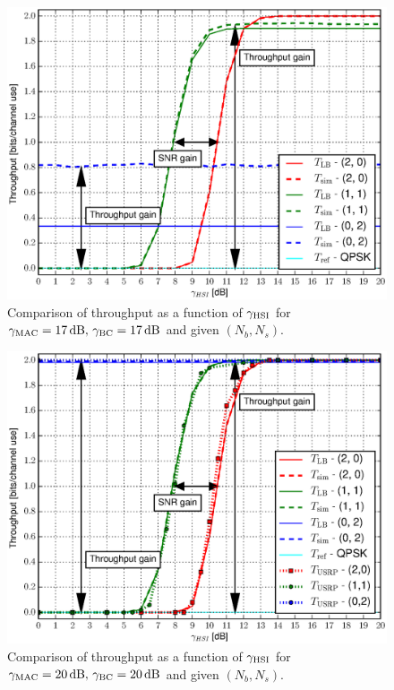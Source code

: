 \documentclass{article}
\begin{document}
\begin{figure}
\begin{centering}
\hspace*{-0.04\columnwidth}
\includegraphics[width=0.95\columnwidth]{fig/Throughput_HSI_XOR_MAC17_BC17_N2}
\par\end{centering}

\caption{Comparison of throughput as a function of $\gamma_{{\rm {HSI}}}$
for $\gamma_{{\rm {MAC}}}=17\,\mathrm{dB},\,\gamma_{{\rm {BC}}}=17\,\mathrm{dB}$
and given $(N_{b},N_{s})$.\label{fig:CTUpp_Throughput17_17}}
\end{figure}


\begin{figure}
\begin{centering}
\hspace*{-0.04\columnwidth}
\includegraphics[width=0.95\columnwidth]{fig/Throughput_HSI_XOR_MAC20_BC20_N2}
\par\end{centering}

\caption{Comparison of throughput as a function of $\gamma_{{\rm {HSI}}}$
for $\gamma_{{\rm {MAC}}}=20\,\mathrm{dB},\,\gamma_{{\rm {BC}}}=20\,\mathrm{dB}$
and given $(N_{b},N_{s})$. \label{fig:CTUpp_Throughput20_20}}
\end{figure}
\end{document}
